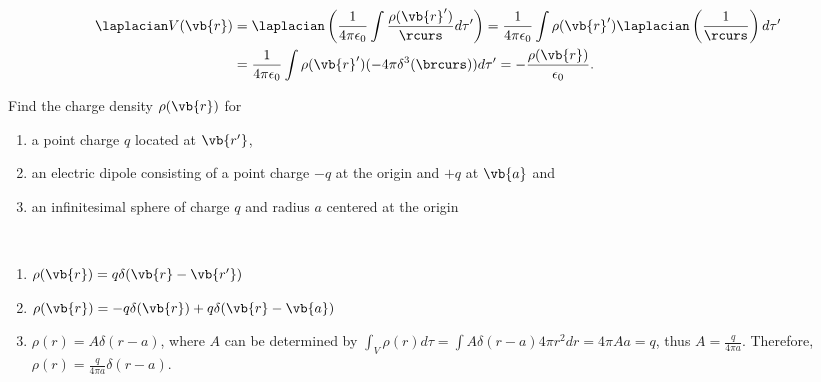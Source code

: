 \documentclass[english,a4paper,12pt]{report}
\begin{document}
\begin{equation}
	\begin{aligned} 
	\laplacian V(\vb{r} ) &= \laplacian  \left( \frac{1}{4\pi \epsilon_0} \int \frac{\rho (\vb{r} ')}{\rcurs }d\tau '  \right) = \frac{1}{4\pi \epsilon_0} \int \rho (\vb{r} ') \laplacian \left( \frac{1}{\rcurs }  \right) d\tau' \\
	&= \frac{1}{4\pi \epsilon_0} \int \rho (\vb{r} ')(-4\pi \delta ^3 (\brcurs ))d\tau ' = -\frac{\rho (\vb{r} )}{\epsilon_0 }.   
	\end{aligned} 
\end{equation}


	
{Find the charge density \(\rho(\vb{r})\) for
\begin{enumerate}
	\item a point charge  \(q\) located at \(\vb{r'}\),\\
	\item an electric dipole consisting of a point charge \(-q\) at the origin and \(+q\) at \(\vb{a}\) and\\
	\item an infinitesimal sphere of charge \(q\) and radius \(a\) centered at the origin
\end{enumerate}~}
{\begin{enumerate}
	\item \(\rho(\vb{r}) = q\delta(\vb{r} - \vb{r'}) \)\\

	\item \(\rho(\vb{r}) = -q\delta(\vb{r}) + q\delta(\vb{r} - \vb{a})\)\\	

	\item \(\rho(r) = A\delta(r - a)\), where \(A\) can be determined by \(\int_{V} \rho(r) d\tau = \int A\delta(r-a) 4\pi r^2 dr = 4\pi Aa = q\), thus \(A = \frac{q}{4\pi a}\). Therefore, \(\rho(r) = \frac{q}{4\pi a}\delta(r - a)\).
\end{enumerate}~}
\end{document}

